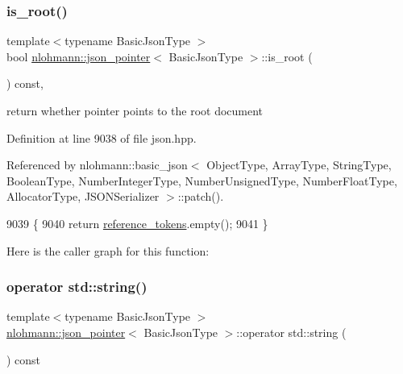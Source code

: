 \subsubsection{\texorpdfstring{is\+\_\+root()}{is\_root()}}
{\footnotesize\ttfamily template$<$typename Basic\+Json\+Type $>$ \\
bool \hyperlink{classnlohmann_1_1json__pointer}{nlohmann\+::json\+\_\+pointer}$<$ Basic\+Json\+Type $>$\+::is\+\_\+root (\begin{DoxyParamCaption}{ }\end{DoxyParamCaption}) const\hspace{0.3cm}{\ttfamily [inline]}, {\ttfamily [private]}}



return whether pointer points to the root document 



Definition at line 9038 of file json.\+hpp.



Referenced by nlohmann\+::basic\+\_\+json$<$ Object\+Type, Array\+Type, String\+Type, Boolean\+Type, Number\+Integer\+Type, Number\+Unsigned\+Type, Number\+Float\+Type, Allocator\+Type, J\+S\+O\+N\+Serializer $>$\+::patch().


\begin{DoxyCode}
9039     \{
9040         \textcolor{keywordflow}{return} \hyperlink{classnlohmann_1_1json__pointer_a07a990a6838de4f38ee9d881e7b9fd61}{reference\_tokens}.empty();
9041     \}
\end{DoxyCode}
Here is the caller graph for this function\+:
\mbox{\label{classnlohmann_1_1json__pointer_ae9015c658f99cf3d48a8563accc79988}} 
\subsubsection{\texorpdfstring{operator std\+::string()}{operator std::string()}}
{\footnotesize\ttfamily template$<$typename Basic\+Json\+Type $>$ \\
\hyperlink{classnlohmann_1_1json__pointer}{nlohmann\+::json\+\_\+pointer}$<$ Basic\+Json\+Type $>$\+::operator std\+::string (\begin{DoxyParamCaption}{ }\end{DoxyParamCaption}) const\hspace{0.3cm}{\ttfamily [inline]}}



